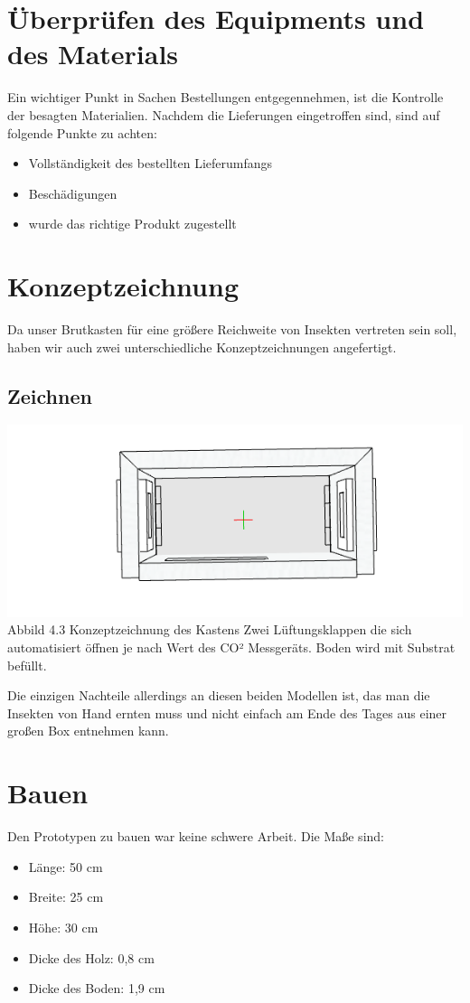 \section{Überprüfen des Equipments und des Materials}
Ein wichtiger Punkt in Sachen Bestellungen entgegennehmen, ist  die Kontrolle der besagten Materialien. Nachdem die Lieferungen eingetroffen sind, sind auf folgende Punkte zu achten:

\begin{itemize}
	\item Vollständigkeit des bestellten Lieferumfangs
	\item Beschädigungen
	\item wurde das richtige Produkt zugestellt
\end{itemize}

\section{Konzeptzeichnung}
Da unser Brutkasten für eine größere Reichweite von Insekten vertreten sein soll, haben wir auch zwei unterschiedliche Konzeptzeichnungen angefertigt.
\subsection{Zeichnen}

\includegraphics[width=0.9\linewidth]{figures/Grundriss.PNG}
Abbild 4.3 Konzeptzeichnung des Kastens
Zwei Lüftungsklappen die sich automatisiert öffnen je nach Wert des CO² Messgeräts. Boden wird mit Substrat befüllt. 

Die einzigen Nachteile allerdings an diesen beiden Modellen ist, das man die Insekten von Hand ernten muss und nicht einfach am Ende des Tages aus einer großen Box entnehmen kann.

\section{Bauen}

Den Prototypen zu bauen war keine schwere Arbeit. Die Maße sind:
\begin{itemize}
	\item Länge: 50 cm
	\item Breite: 25 cm
	\item Höhe: 30 cm
	\item Dicke des Holz: 0,8 cm 
	\item Dicke des Boden: 1,9 cm
\end{itemize}

